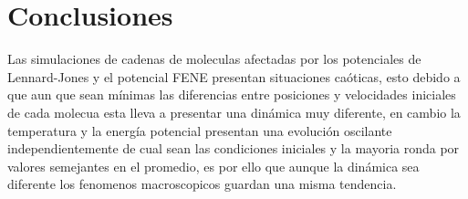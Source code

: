 \section{Conclusiones}
Las simulaciones de cadenas de moleculas afectadas por los potenciales de Lennard-Jones y el potencial FENE
presentan situaciones caóticas, esto debido a que aun que sean mínimas las diferencias entre posiciones y velocidades iniciales de 
cada molecua esta lleva a presentar una dinámica muy diferente, en cambio la temperatura y la energía potencial 
presentan una evolución oscilante independientemente de cual sean las condiciones iniciales y la mayoria ronda por valores semejantes
en el promedio, es por ello que aunque la dinámica sea diferente los fenomenos macroscopicos guardan una misma tendencia.